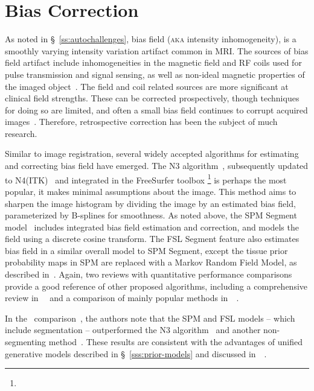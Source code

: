 \section{Bias Correction}\label{s:pre-bias}
As noted in \S~\ref{ss:autochallenges}, bias field (\textsc{aka} intensity inhomogeneity),
is a smoothly varying intensity variation artifact common in MRI.
The sources of bias field artifact include
inhomogeneities in the magnetic field and RF coils used for pulse transmission and signal sensing,
as well as non-ideal magnetic properties of the imaged object~\cite{Vovk2007}.
The field and coil related sources are more significant at clinical field strengths.
These can be corrected prospectively, though techniques for doing so are limited,
and often a small bias field continues to corrupt acquired images~\cite{Vovk2007}.
Therefore, retrospective correction has been the subject of much research.
\par
Similar to image registration,
several widely accepted algorithms for estimating and correcting bias field have emerged.
The N3 algorithm~\cite{Sled1998}, subsequently updated to N4(ITK)~\cite{Tustison2010}
and integrated in the FreeSurfer toolbox%
\footnote{}
is perhaps the most popular, it makes minimal assumptions about the image.
This method aims to sharpen the image histogram by dividing the image by an estimated bias field,
parameterized by B-splines for smoothness.
As noted above, the SPM Segment model~\cite{Ashburner2005} 
includes integrated bias field estimation and correction,
and models the field using a discrete cosine transform.
The FSL Segment feature also estimates bias field in a similar overall model to SPM Segment,
except the tissue prior probability maps in SPM are replaced with a Markov Random Field Model,
as described in~\cite{Zhang2001}.
Again, two reviews with quantitative performance comparisons
provide a good reference of other proposed algorithms,
including a comprehensive review in~\citeyear{Belaroussi2006}~\cite{Belaroussi2006}
and a comparison of mainly popular methods in~\citeyear{Ganzetti2016}~\cite{Ganzetti2016}.
\par
In the~\citeyear{Ganzetti2016} comparison~\cite{Ganzetti2016},
the authors note that the SPM and FSL models -- which include segmentation --
outperformed the N3 algorithm~\cite{Sled1998} and another non-segmenting method~\cite{Dawant1993}.
These results are consistent with
the advantages of unified generative models described in \S~\ref{sss:prior-models}
and discussed in~~\cite{Ashburner2005}.
